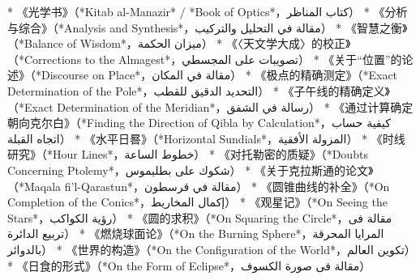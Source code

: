 * 《光学书》（*Kitab al-Manazir* / *Book of Optics*，كتاب المناظر）
* 《分析与综合》（*Analysis and Synthesis*，مقالة في التحليل والتركيب）
* 《智慧之衡》（*Balance of Wisdom*，ميزان الحكمة）
* 《〈天文学大成〉的校正》（*Corrections to the Almagest*，تصويبات على المجسطي）
* 《关于“位置”的论述》（*Discourse on Place*，مقالة في المكان）
* 《极点的精确测定》（*Exact Determination of the Pole*，التحديد الدقيق للقطب）
* 《子午线的精确定义》（*Exact Determination of the Meridian*，رسالة في الشفق）
* 《通过计算确定朝向克尔白》（*Finding the Direction of Qibla by Calculation*，كيفية حساب اتجاه القبلة）
* 《水平日晷》（*Horizontal Sundials*，المزولة الأفقية）
* 《时线研究》（*Hour Lines*，خطوط الساعة）
* 《对托勒密的质疑》（*Doubts Concerning Ptolemy*，شكوك على بطليموس）
* 《关于克拉斯通的论文》（*Maqala fi'l-Qarastun*，مقالة في قرسطون）
* 《圆锥曲线的补全》（*On Completion of the Conics*，إكمال المخاريط）
* 《观星记》（*On Seeing the Stars*，رؤية الكواكب）
* 《圆的求积》（*On Squaring the Circle*，مقالة فی تربیع الدائرة）
* 《燃烧球面论》（*On the Burning Sphere*，المرايا المحرقة بالدوائر）
* 《世界的构造》（*On the Configuration of the World*，تكوين العالم）
* 《日食的形式》（*On the Form of Eclipse*，مقالة فی صورة ‌الکسوف）
